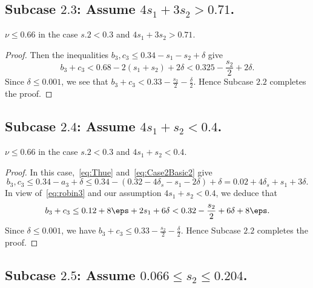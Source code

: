 \subsection*{Subcase $\mathbf{2.3}$: Assume $4s_1+3s_2>0.71$.}

\begin{lemma}\label{lem:Subcase2.3}
  \leanok
  $\nu \leq 0.66$ in the case $s.2 < 0.3$ and $4s_1+3s_2>0.71$.
\end{lemma}
\begin{proof}
  \leanok
  Then the inequalities $b_3,c_3 \le 0.34-s_1-s_2+ \delta$ give
  \[
  b_3+c_3<0.68-2(s_1+s_2)+2\delta<
  0.325 -\frac{s_2}{2}+2\delta.
  \]
  Since $\delta\leq 0.001$, we see that $b_3+c_3<0.33-\frac{s_2}{2}-\frac{\delta}{2}$.
  Hence Subcase $\mathbf{2.2}$ completes the proof.
\end{proof}

\subsection*{Subcase $\mathbf{2.4}$: Assume $4s_1+s_2<0.4$.}

\begin{lemma}\label{lem:Subcase2.4}
  \leanok
  $\nu \leq 0.66$ in the case $s.2 < 0.3$ and $4s_1+s_2<0.4$.
\end{lemma}
\begin{proof}
  \leanok
  In this case,~\eqref{eq:Thue} and~\eqref{eq:Case2Basic2} give
  \[
  b_3,c_3 \le 0.34-a_3+\delta \le 0.34 - (0.32-4\delta_s-s_1-2\delta) +\delta= 0.02+4\delta_s+s_1+3\delta.
  \]
  In view of~\eqref{eq:robin3} and
  our assumption $4s_1+s_2<0.4$, we deduce that
  \begin{align*}
    b_3+c_3 \le 0.12+8\eps + 2s_1+6\delta <
    0.32-\frac{s_2}{2}+6\delta+8\eps.
  \end{align*}
  Since $\delta\leq 0.001$, we have $b_3+c_3 \le 0.33-\frac{s_2}{2}-\frac{\delta}{2}$. Hence
  Subcase $\mathbf{2.2}$ completes the proof.
\end{proof}


\subsection*{Subcase $\mathbf{2.5}$: Assume $0.066\leq s_2\leq
0.204$.}


